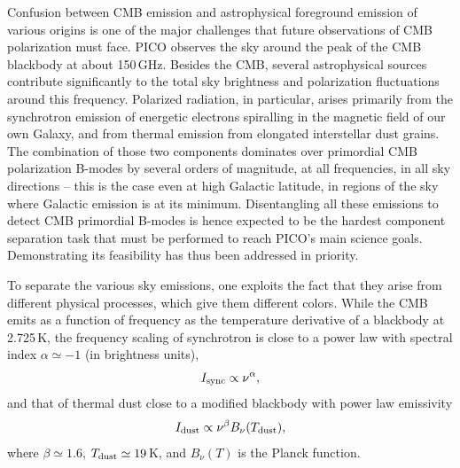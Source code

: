 \documentclass[PICOReport.tex]{subfiles}
\begin{document}

Confusion between CMB emission and astrophysical foreground emission of various origins is one of the major challenges that future observations of CMB polarization must face. PICO observes the sky around the peak of the CMB blackbody at about 150\,GHz. Besides the CMB, several astrophysical sources contribute significantly to the total sky brightness and polarization fluctuations around this frequency. 
Polarized radiation, in particular, arises primarily from the synchrotron emission of energetic electrons spiralling in the magnetic field of our own Galaxy, and from thermal emission from elongated interstellar dust grains. The combination of those two components dominates over primordial CMB polarization B-modes by several orders of magnitude, at all frequencies, in all sky directions -- this is the case even at high Galactic latitude, in regions of the sky where Galactic emission is at its minimum.
%
Disentangling all these emissions to detect CMB primordial B-modes is hence expected to be the hardest component separation task that must be performed to reach PICO's main science goals. Demonstrating its feasibility has thus been addressed in priority.

To separate the various sky emissions, one exploits the fact that they arise from different physical processes, which give them different colors. While the CMB emits as a function of frequency as the temperature derivative of a blackbody at 2.725\,K, the frequency scaling of synchrotron is close to a power law with spectral index $\alpha \simeq -1$ (in brightness units), 
\begin{equation}
I_{\rm sync} \propto \nu^{\alpha},
\end{equation}
and that of thermal dust close to a modified blackbody with power law emissivity
\begin{equation}
I_{\rm dust} \propto \nu^{\beta} B_\nu(T_{\rm dust}),
\end{equation}
where $\beta \simeq 1.6$, $T_{\rm dust} \simeq 19$\,K, and $B_\nu(T)$ is the Planck function.
\end{document}
